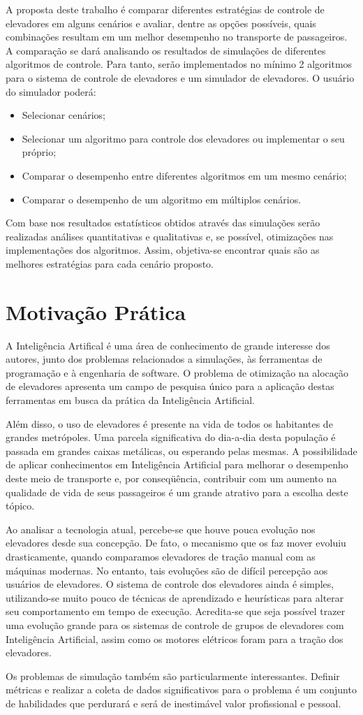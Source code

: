 A proposta deste trabalho é comparar diferentes estratégias de controle de elevadores em alguns cenários e avaliar, dentre as opções possíveis, quais combinações resultam em um melhor desempenho no transporte de passageiros. A comparação se dará analisando os resultados de simulações de diferentes algoritmos de controle. Para tanto, serão implementados no mínimo 2 algoritmos para o sistema de controle de elevadores e um simulador de elevadores. O usuário do simulador poderá:

\begin{itemize}
  \item Selecionar cenários;
  \item Selecionar um algoritmo para controle dos elevadores ou implementar o seu próprio;
  \item Comparar o desempenho entre diferentes algoritmos em um mesmo cenário;
  \item Comparar o desempenho de um algoritmo em múltiplos cenários.
\end{itemize}

Com base nos resultados estatísticos obtidos através das simulações serão realizadas análises quantitativas e qualitativas e, se possível, otimizações nas implementações dos algoritmos. Assim, objetiva-se encontrar quais são as melhores estratégias para cada cenário proposto.

\section{Motivação Prática}

A Inteligência Artifical é uma área de conhecimento de grande interesse dos autores, junto dos problemas relacionados a simulações, às ferramentas de programação e à engenharia de software. O problema de otimização na alocação de elevadores apresenta um campo de pesquisa único para a aplicação destas ferramentas em busca da prática da Inteligência Artificial.

Além disso, o uso de elevadores é presente na vida de todos os habitantes de grandes metrópoles. Uma parcela significativa do dia-a-dia desta população é passada em grandes caixas metálicas, ou esperando pelas mesmas. A possibilidade de aplicar conhecimentos em Inteligência Artificial para melhorar o desempenho deste meio de transporte e, por conseqüência, contribuir com um aumento na qualidade de vida de seus passageiros é um grande atrativo para a escolha deste tópico.

Ao analisar a tecnologia atual, percebe-se que houve pouca evolução nos elevadores desde sua concepção. De fato, o mecanismo que os faz mover evoluiu drasticamente, quando comparamos elevadores de tração manual com as máquinas modernas. No entanto, tais evoluções são de difícil percepção aos usuários de elevadores. O sistema de controle dos elevadores ainda é simples, utilizando-se muito pouco de técnicas de aprendizado e heurísticas para alterar seu comportamento em tempo de execução. Acredita-se que seja possível trazer uma evolução grande para os sistemas de controle de grupos de elevadores com Inteligência Artificial, assim como os motores elétricos foram para a tração dos elevadores.

Os problemas de simulação também são particularmente interessantes. Definir métricas e realizar a coleta de dados significativos para o problema é um conjunto de habilidades que perdurará e será de inestimável valor profissional e pessoal.